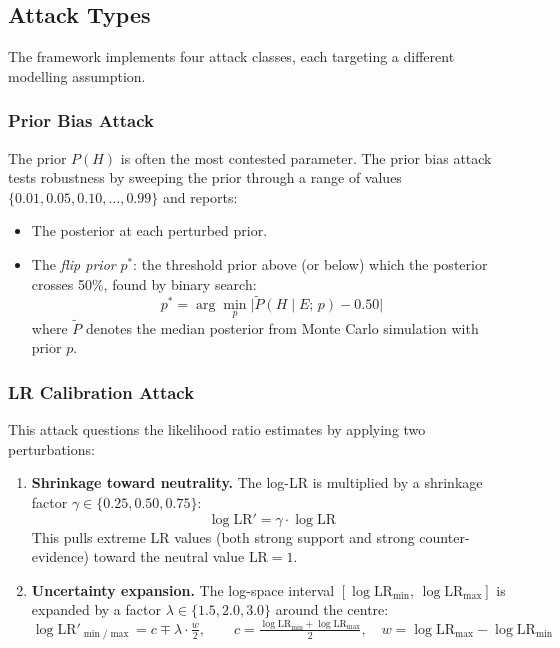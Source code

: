 \documentclass[11pt,a4paper]{article}
\begin{document}
\subsection{Attack Types}

The framework implements four attack classes, each targeting a different
modelling assumption.

\subsubsection{Prior Bias Attack}

The prior $P(H)$ is often the most contested parameter.  The prior bias attack
tests robustness by sweeping the prior through a range of values
$\{0.01, 0.05, 0.10, \ldots, 0.99\}$ and reports:
\begin{itemize}
\item The posterior at each perturbed prior.
\item The \emph{flip prior} $p^*$: the threshold prior above (or below) which
  the posterior crosses 50\%, found by binary search:
  \[
    p^* = \arg\min_p \bigl| \widetilde{P}(H \mid E;\, p) - 0.50 \bigr|
  \]
  where $\widetilde{P}$ denotes the median posterior from Monte Carlo
  simulation with prior $p$.
\end{itemize}

\subsubsection{LR Calibration Attack}

This attack questions the likelihood ratio estimates by applying two
perturbations:
\begin{enumerate}
\item \textbf{Shrinkage toward neutrality.}  The log-LR is multiplied by a
  shrinkage factor $\gamma \in \{0.25, 0.50, 0.75\}$:
  \[
    \log \text{LR}' = \gamma \cdot \log \text{LR}
  \]
  This pulls extreme LR values (both strong support and strong counter-evidence)
  toward the neutral value $\text{LR} = 1$.
\item \textbf{Uncertainty expansion.}  The log-space interval
  $[\log \text{LR}_{\min},\, \log \text{LR}_{\max}]$ is expanded by a factor
  $\lambda \in \{1.5, 2.0, 3.0\}$ around the centre:
  \[
    \log \text{LR}'_{\min/\max}
      = c \mp \lambda \cdot \tfrac{w}{2},
    \qquad
    c = \tfrac{\log \text{LR}_{\min} + \log \text{LR}_{\max}}{2},
    \quad
    w = \log \text{LR}_{\max} - \log \text{LR}_{\min}
  \]
\end{enumerate}
\end{document}
